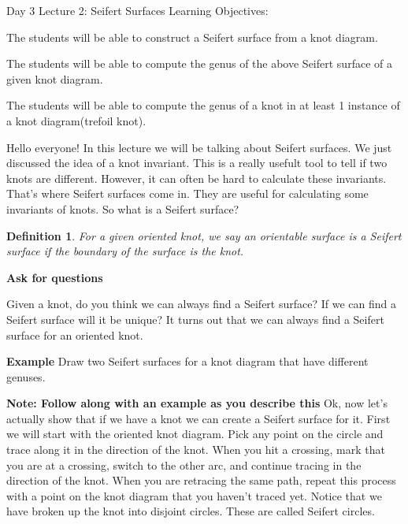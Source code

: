 \documentclass{article}
\newtheorem{definition}{Definition}
\begin{document}
\begin{section}{Day 3 Lecture 2: Seifert Surfaces}
Learning Objectives:

The students will be able to construct a Seifert surface from a knot diagram.

The students will be able to compute the genus of the above Seifert surface of a given knot diagram.

The students will be able to compute the genus of a knot in at least 1 instance of a knot diagram(trefoil knot).\medbreak

Hello everyone! In this lecture we will be talking about Seifert surfaces. We just discussed the idea of a knot invariant. This is a really usefult tool to tell if two knots are different. However, it can often be hard to calculate these invariants. That's where Seifert surfaces come in. They are useful for calculating some invariants of knots. So what is a Seifert surface?

\begin{definition}
For a given oriented knot, we say an orientable surface is a Seifert surface if the boundary of the surface is the knot.
\end{definition}

\textbf{Ask for questions}

Given a knot, do you think we can always find a Seifert surface? If we can find a Seifert surface will it be unique? It turns out that we can always find a Seifert surface for an oriented knot.

\textbf{Example} Draw two Seifert surfaces for a knot diagram that have different genuses.

\textbf{Note: Follow along with an example as you describe this}
Ok, now let's actually show that if we have a knot we can create a Seifert surface for it. First we will start with the oriented knot diagram. Pick any point on the circle and trace along it in the direction of the knot. When you hit a crossing, mark that you are at a crossing, switch to the other arc, and continue tracing in the direction of the knot. When you are retracing the same path, repeat this process with a point on the knot diagram that you haven't traced yet. Notice that we have broken up the knot into disjoint circles. These are called Seifert circles.\medbreak


\end{section}
\end{document}

